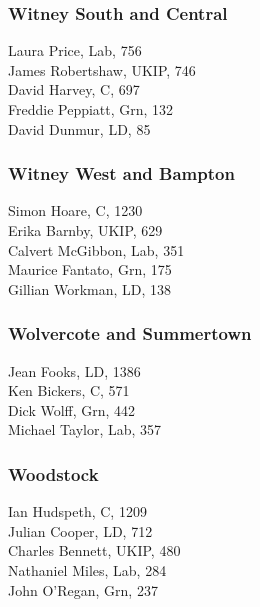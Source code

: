 \documentclass[a4paper,openany,10pt]{book}
\begin{document}
\subsubsection*{Witney South and Central}



Laura Price, Lab, 756\\
James Robertshaw, UKIP, 746\\
David Harvey, C, 697\\
Freddie Peppiatt, Grn, 132\\
David Dunmur, LD, 85\\


\subsubsection*{Witney West and Bampton}



Simon Hoare, C, 1230\\
Erika Barnby, UKIP, 629\\
Calvert McGibbon, Lab, 351\\
Maurice Fantato, Grn, 175\\
Gillian Workman, LD, 138\\


\subsubsection*{Wolvercote and Summertown}



Jean Fooks, LD, 1386\\
Ken Bickers, C, 571\\
Dick Wolff, Grn, 442\\
Michael Taylor, Lab, 357\\


\subsubsection*{Woodstock}



Ian Hudspeth, C, 1209\\
Julian Cooper, LD, 712\\
Charles Bennett, UKIP, 480\\
Nathaniel Miles, Lab, 284\\
John O'Regan, Grn, 237\\
\end{document}
